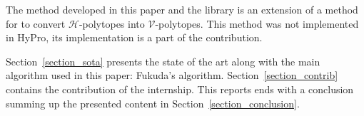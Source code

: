 The method developed in this paper and the library is an extension of a method for to convert $\mathcal{H}$-polytopes into $\mathcal{V}$-polytopes. This method was not implemented in HyPro, its implementation is a part of the contribution.

Section~\ref{section_sota} presents the state of the art along with the main algorithm used in this paper: Fukuda's algorithm. Section~\ref{section_contrib} contains the contribution of the internship. This reports ends with a conclusion summing up the presented content in Section~\ref{section_conclusion}. 



